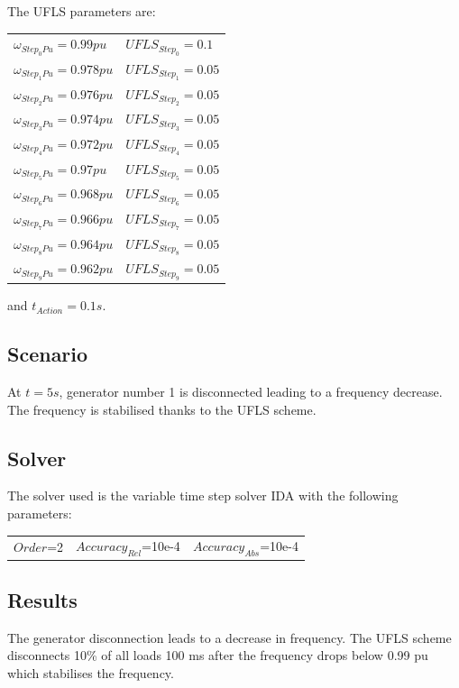\documentclass[a4paper, 12pt]{report}
\begin{document}
The UFLS parameters are:
\begin{center}
\begin{tabular}{l|l}
   $\omega_{Step_0{Pu}}=0.99pu$ & $UFLS_{Step_0}=0.1$ \\
   $\omega_{Step_1{Pu}}=0.978pu$ & $UFLS_{Step_1}=0.05$ \\
   $\omega_{Step_2{Pu}}=0.976pu$ & $UFLS_{Step_2}=0.05$ \\
   $\omega_{Step_3{Pu}}=0.974pu$ & $UFLS_{Step_3}=0.05$ \\
   $\omega_{Step_4{Pu}}=0.972pu$ & $UFLS_{Step_4}=0.05$ \\
   $\omega_{Step_5{Pu}}=0.97pu$ & $UFLS_{Step_5}=0.05$ \\
   $\omega_{Step_6{Pu}}=0.968pu$ & $UFLS_{Step_6}=0.05$ \\
   $\omega_{Step_7{Pu}}=0.966pu$ & $UFLS_{Step_7}=0.05$ \\
   $\omega_{Step_8{Pu}}=0.964pu$ & $UFLS_{Step_8}=0.05$ \\
   $\omega_{Step_9{Pu}}=0.962pu$ & $UFLS_{Step_9}=0.05$ \\
\end{tabular}
\end{center}

and $t_{Action}=0.1s$.

\subsection{Scenario}
At $t=5s$, generator number 1 is disconnected leading to a frequency decrease. The frequency is stabilised thanks to the UFLS scheme.

\subsection{Solver}
The solver used is the variable time step solver IDA with the following parameters:
\begin{center}
\begin{tabular}{l|l|l}
   $Order$=2 & $Accuracy_{Rel}$=10e-4 & $Accuracy_{Abs}$=10e-4 \\
\end{tabular}
\end{center}

\newpage
\subsection{Results}

The generator disconnection leads to a decrease in frequency. The UFLS scheme disconnects 10\% of all loads 100 ms after the frequency drops below 0.99 pu which stabilises the frequency.
\end{document}
